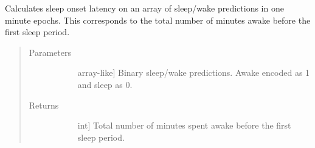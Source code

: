 \documentclass[letterpaper,10pt,english]{sphinxmanual}
\begin{document}
\begin{fulllineitems}
\label{\detokenize{index:sleeppy.utils.sleep_onset_latency}}
Calculates sleep onset latency on an array of sleep/wake predictions in one minute epochs. This corresponds to the
total number of minutes awake before the first sleep period.
\begin{quote}\begin{description}
\item[{Parameters}] \leavevmode\begin{description}
\item[{}] \leavevmode{[}array-like{]}
Binary sleep/wake predictions. Awake encoded as 1 and sleep as 0.

\end{description}

\item[{Returns}] \leavevmode\begin{description}
\item[{}] \leavevmode{[}int{]}
Total number of minutes spent awake before the first sleep period.

\end{description}

\end{description}\end{quote}

\end{fulllineitems}

\end{document}
